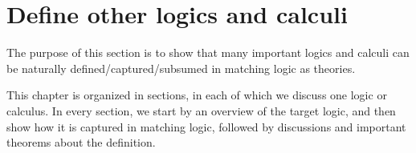 \chapter{Define other logics and calculi}


The purpose of this section is to show that
many important logics and calculi can be naturally
defined/captured/subsumed
in matching logic as theories.

This chapter is organized in sections,
in each of which we discuss one logic or calculus.
In every section, we start by an overview of the
target logic, and then show how it is captured in
matching logic, followed by discussions and important
theorems about the definition.





